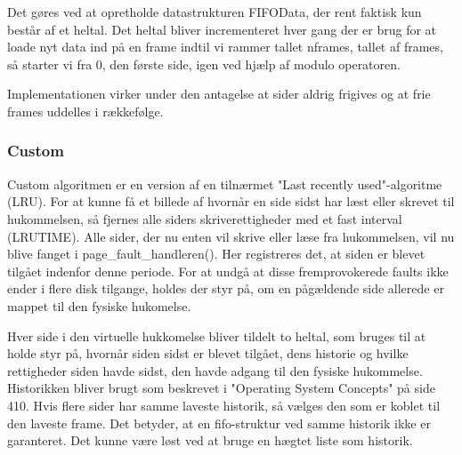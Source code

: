 Det gøres ved at opretholde datastrukturen FIFOData, der rent faktisk kun består af et heltal. Det heltal bliver incrementeret hver gang der er brug for at loade nyt data ind på en frame indtil vi rammer tallet nframes, tallet af frames, så starter vi fra 0, den første side, igen ved hjælp af modulo operatoren.

Implementationen virker under den antagelse at sider aldrig frigives og at frie frames uddelles i rækkefølge.


\subsubsection*{Custom}
Custom algoritmen er en version af en tilnærmet "Last recently used"-algoritme (LRU). For at kunne få et billede af hvornår en side sidst har læst eller skrevet til hukommelsen, så fjernes alle siders skriverettigheder med et fast interval (LRUTIME). Alle sider, der nu enten vil skrive eller læse fra hukommelsen, vil nu blive fanget i page\_fault\_handleren(). Her registreres det, at siden er blevet tilgået indenfor denne periode. For at undgå at disse fremprovokerede faults ikke ender i flere disk tilgange, holdes der styr på, om en pågældende side allerede er mappet til den fysiske hukomelse.

Hver side i den virtuelle hukkomelse bliver tildelt to heltal, som bruges til at holde styr på, hvornår siden sidst er blevet tilgået, dens historie og hvilke rettigheder siden havde sidst, den havde adgang til den fysiske hukommelse. Historikken bliver brugt som beskrevet i "Operating System Concepts" på side 410. Hvis flere sider har samme laveste historik, så vælges den som er koblet til den laveste frame. Det betyder, at en fifo-struktur ved samme historik ikke er garanteret. Det kunne være løst ved at bruge en hægtet liste som historik.
